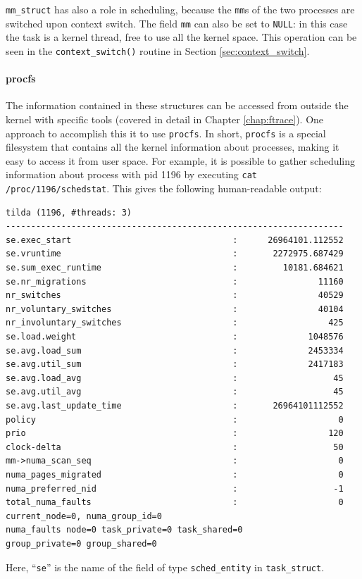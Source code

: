 \verb|mm_struct| has also a role in scheduling, because the \verb|mm|s of the two processes are switched upon context switch. The field \verb|mm| can also be set to \verb|NULL|: in this case the task is a kernel thread, free to use all the kernel space. This operation can be seen in the \verb|context_switch()| routine in Section \ref{sec:context_switch}.

\paragraph{procfs}
The information contained in these structures can be accessed from outside the kernel with specific tools (covered in detail in Chapter \ref{chap:ftrace}). One approach to accomplish this it to use \verb|procfs|. In short, \verb|procfs| is a special filesystem that contains all the kernel information about processes, making it easy to access it from user space. For example, it is possible to gather scheduling information about process with pid 1196 by executing \verb|cat /proc/1196/schedstat|. This gives the following human-readable output:

\begin{verbatim}
tilda (1196, #threads: 3)
-------------------------------------------------------------------
se.exec_start                                :      26964101.112552
se.vruntime                                  :       2272975.687429
se.sum_exec_runtime                          :         10181.684621
se.nr_migrations                             :                11160
nr_switches                                  :                40529
nr_voluntary_switches                        :                40104
nr_involuntary_switches                      :                  425
se.load.weight                               :              1048576
se.avg.load_sum                              :              2453334
se.avg.util_sum                              :              2417183
se.avg.load_avg                              :                   45
se.avg.util_avg                              :                   45
se.avg.last_update_time                      :       26964101112552
policy                                       :                    0
prio                                         :                  120
clock-delta                                  :                   50
mm->numa_scan_seq                            :                    0
numa_pages_migrated                          :                    0
numa_preferred_nid                           :                   -1
total_numa_faults                            :                    0
current_node=0, numa_group_id=0
numa_faults node=0 task_private=0 task_shared=0 
group_private=0 group_shared=0
\end{verbatim}
Here, ``\verb|se|'' is the name of the field of type \verb|sched_entity| in \verb|task_struct|.

